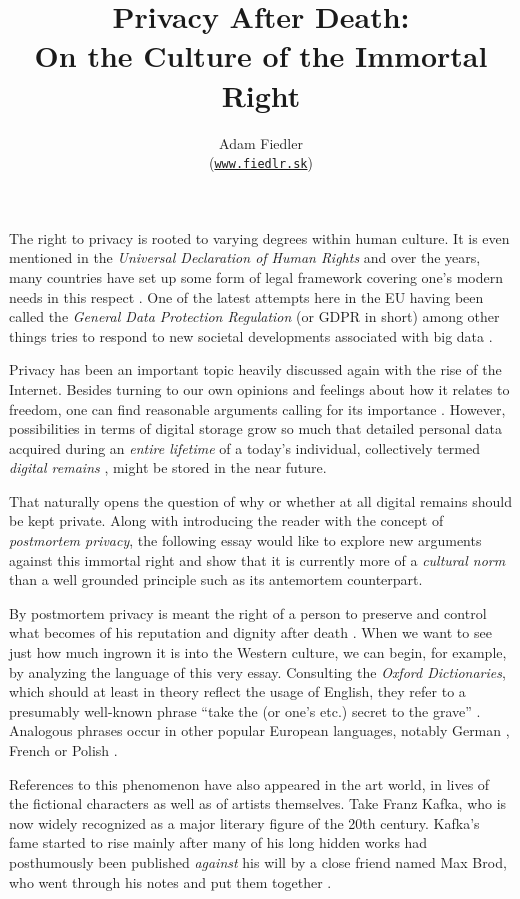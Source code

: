 \documentclass[a4paper]{article}
\title{
    Privacy After Death:\\
    On the Culture of the Immortal Right
}
\author{
    Adam Fiedler\\
    \small
    (\texttt{\href{http://fiedlr.sk}{www.fiedlr.sk}})
}
\date{}
\begin{document}
\maketitle

The right to privacy is rooted to varying degrees within human culture. It is even mentioned in the \textit{Universal Declaration of Human Rights} \cite{udrights} and over the years, many countries have set up some form of legal framework covering one's modern needs in this respect \cite{consumerreport}. One of the latest attempts here in the EU having been called the \textit{General Data Protection Regulation} (or GDPR in short) among other things tries to respond to new societal developments associated with big data \cite{louveaux}.

Privacy has been an important topic heavily discussed again with the rise of the Internet. Besides turning to our own opinions and feelings about how it relates to freedom, one can find reasonable arguments calling for its importance \cite{harbinja2}.
However, possibilities in terms of digital storage grow so much that detailed personal data acquired during an \emph{entire lifetime} of a today's individual, collectively termed \textit{digital remains} \cite{buitelaar}, might be stored in the near future.

That naturally opens the question of why or whether at all digital remains should be kept private. Along with introducing the reader with the concept of \textit{postmortem privacy}, the following essay would like to explore new arguments against this immortal right and show that it is currently more of a \emph{cultural norm} than a well grounded principle such as its antemortem counterpart.

\medskip
By postmortem privacy is meant the right of a person to preserve and control what becomes of his reputation and dignity after death \cite{harbinja2, buitelaar}. When we want to see just how much ingrown it is into the Western culture, we can begin, for example, by analyzing the language of this very essay. Consulting the \textit{Oxford Dictionaries}, which should at least in theory reflect the usage of English, they refer to a presumably well-known phrase ``take the (or one's etc.) secret to the grave'' \cite{oxford}. Analogous phrases occur in other popular European languages, notably German \cite{duden}, French \cite{larousse} or Polish \cite{wsjp}.

References to this phenomenon have also appeared in the art world, in lives of the fictional characters as well as of artists themselves. Take Franz Kafka, who is now widely recognized as a major literary figure of the 20th century.
Kafka's fame started to rise mainly after many of his long hidden works had posthumously been published \emph{against} his will by a close friend named Max Brod, who went through his notes and put them together \cite{kafka, brod}.
\end{document}
